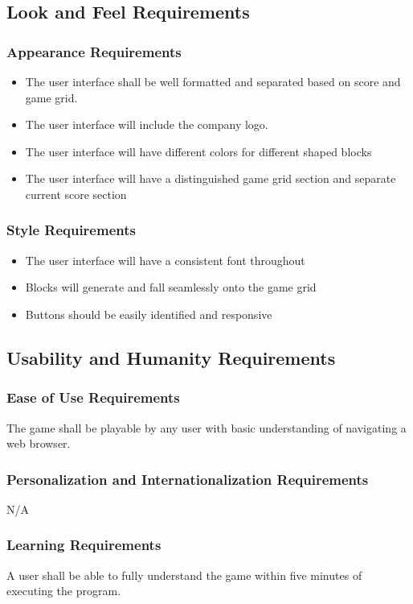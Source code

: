 \documentclass[12pt, titlepage]{article}
\begin{document}
\subsection{Look and Feel Requirements}
\subsubsection{Appearance Requirements}
\begin{itemize}
\item The user interface shall be well formatted and separated based on score and game grid.
\item The user interface will include the company logo.
\item The user interface will have different colors for different shaped blocks
\item The user interface will have a distinguished game grid section and separate current score section
\end{itemize}
\subsubsection{Style Requirements}
\begin{itemize}
    \item The user interface will have a consistent font throughout
    \item Blocks will generate and fall seamlessly onto the game grid
    \item Buttons should be easily identified and responsive 
\end{itemize}

\subsection{Usability and Humanity Requirements}
\subsubsection{Ease of Use Requirements}
The game shall be playable by any user with basic understanding of navigating a web browser.
\subsubsection{Personalization and Internationalization Requirements}
N/A
\subsubsection{Learning Requirements}
A user shall be able to fully understand the game within five minutes of executing the program.
\end{document}
